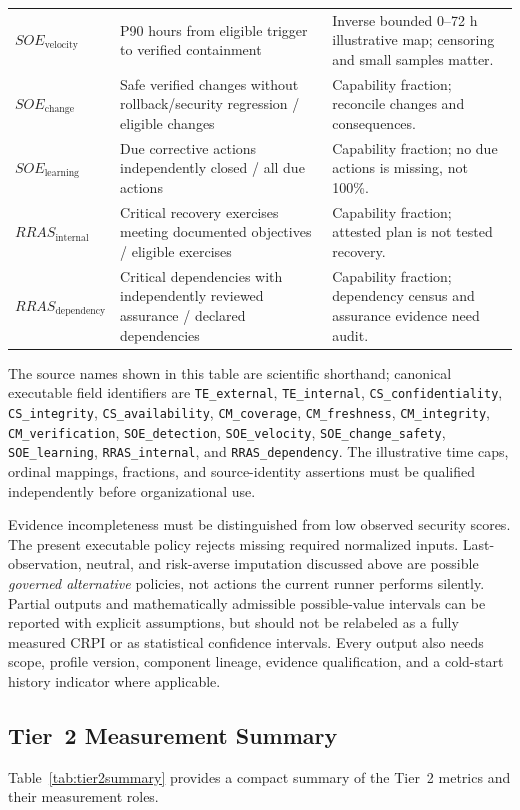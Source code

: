 \documentclass[11pt]{article}
\begin{document}
\begin{longtable}{P{0.22\textwidth} P{0.35\textwidth} P{0.31\textwidth}}
$SOE_{\mathrm{velocity}}$ & P90 hours from eligible trigger to verified containment & Inverse bounded 0--72 h illustrative map; censoring and small samples matter. \\
$SOE_{\mathrm{change}}$ & Safe verified changes without rollback/security regression / eligible changes & Capability fraction; reconcile changes and consequences. \\
$SOE_{\mathrm{learning}}$ & Due corrective actions independently closed / all due actions & Capability fraction; no due actions is missing, not 100\%. \\
$RRAS_{\mathrm{internal}}$ & Critical recovery exercises meeting documented objectives / eligible exercises & Capability fraction; attested plan is not tested recovery. \\
$RRAS_{\mathrm{dependency}}$ & Critical dependencies with independently reviewed assurance / declared dependencies & Capability fraction; dependency census and assurance evidence need audit. \\
\bottomrule
\end{longtable}
\endgroup

The source names shown in this table are scientific shorthand;
canonical executable field identifiers are
\texttt{TE\_external}, \texttt{TE\_internal},
\texttt{CS\_confidentiality}, \texttt{CS\_integrity},
\texttt{CS\_availability}, \texttt{CM\_coverage},
\texttt{CM\_freshness}, \texttt{CM\_integrity},
\texttt{CM\_verification}, \texttt{SOE\_detection},
\texttt{SOE\_velocity}, \texttt{SOE\_change\_safety},
\texttt{SOE\_learning}, \texttt{RRAS\_internal},
and \texttt{RRAS\_dependency}. The illustrative time caps,
ordinal mappings, fractions, and source-identity assertions
must be qualified independently before organizational use.

Evidence incompleteness must be distinguished from low observed security scores.
The present executable policy rejects missing required normalized inputs.
Last-observation, neutral, and risk-averse imputation discussed above are
possible \emph{governed alternative} policies, not actions the current runner
performs silently. Partial outputs and mathematically admissible
possible-value intervals can be reported with explicit assumptions, but should
not be relabeled as a fully measured CRPI or as statistical confidence
intervals. Every output also needs scope, profile version, component lineage,
evidence qualification, and a cold-start history indicator where applicable.

\subsection{Tier~2 Measurement Summary}
Table~\ref{tab:tier2summary} provides a compact summary of the Tier~2 metrics and their
measurement roles.
\end{document}
